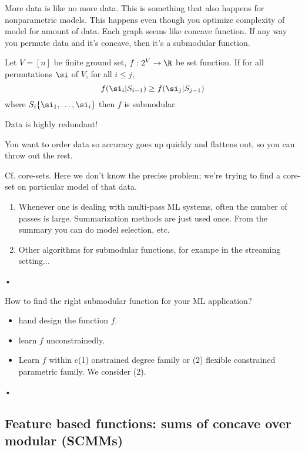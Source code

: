 More data is like no more data. This is something that also happens for nonparametric models. This happens even though you optimize complexity of model for amount of data.
Each graph seems like concave function. If any way you permute data and it's concave, then it's a submodular function.

Let $V=[n]$ be finite ground set, $f:2^V\to \R$ be set function. If for all permutations $\si$ of $V$, for all $i\le j$,
$$
f(\si_i|S_{i-1}) \ge f(\si_j|S_{j-1})
$$
where $S_i\{\si_1,\ldots, \si_i\}$ then $f$ is submodular. 

Data is highly redundant!

You want to order data so accuracy goes up quickly and flattens out, so you can throw out the rest.

Cf. core-sets. Here we don't know the precise problem; we're trying to find a core-set on particular model of that data.
\begin{enumerate}
\item
Whenever one is dealing with multi-pass ML systems, often the number of passes is large. Summarization methods are just used once. From the summary you can do model selection, etc. 
\item
Other algorithms for submodular functions, for exampe in the  streaming setting...
\end{enumerate}•

How to find the right submodular function for your ML application?
\begin{itemize}
\item
hand design the function $f$.
\item
learn $f$ unconstrainedly.
\item
Learn $f$ within c(1) onstrained degree family or (2) flexible constrained parametric family. We consider (2).
\end{itemize}•

\subsection{Feature based functions: sums of concave over modular (SCMMs)}


